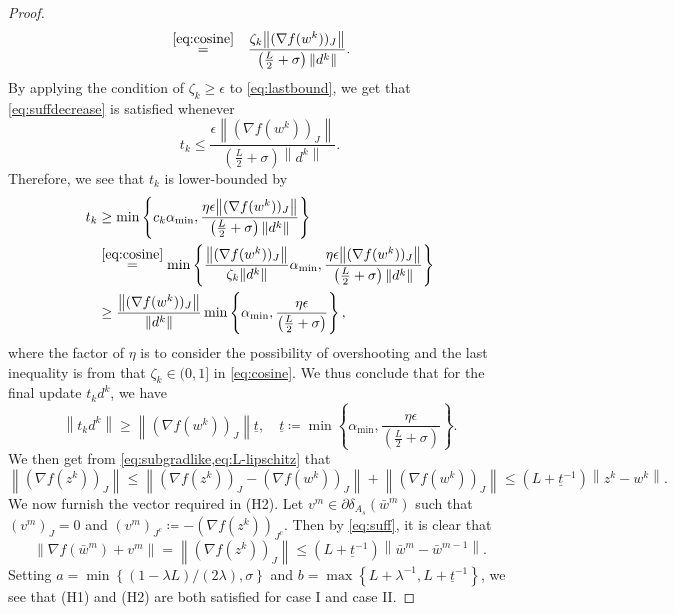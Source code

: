 \documentclass{article}
\theoremstyle{plain}
\theoremstyle{definition}
\theoremstyle{remark}
\newcommand{\norm}[1]{{\left\|{#1}\right\|}}
\begin{document}
\begin{proof}
\begin{eqnarray}
	&\stackrel{\cref{eq:cosine}}{=}& \frac{\zeta_k \norm{(\nabla  
			f(w^k))_{J}}}{\left( \frac{L}{2} + \sigma
		\right)\norm{d^k}}.
	\end{eqnarray}
	By applying the condition of $\zeta_k \geq \epsilon$ to
	\eqref{eq:lastbound},
	we get that \cref{eq:suffdecrease} is satisfied whenever
	\[
		t_k \leq
	\frac{\epsilon \norm{(\nabla  f(w^k))_{J}}}{\left( \frac{L}{2} +
	\sigma\right) \norm{d^k}}.
	\]
	Therefore, we see that $t_k$ is lower-bounded by
	\begin{align*}
		t_k &\geq \min\left\{c_k \alpha_{\min}, 
		\frac{\eta \epsilon \norm{(\nabla  f(w^k))_{J}}}{\left( \frac{L}{2} +
		\sigma\right) \norm{d^k}} \right\} \\
			&\stackrel{\cref{eq:cosine}}{=}
			\min\left\{\frac{\norm{(\nabla f(w^k))_{J} }}{\zeta_k
				\norm{d^k}} \alpha_{\min}, 
			\frac{\eta \epsilon \norm{(\nabla  f(w^k))_{J}}}{\left( \frac{L}{2} +
			\sigma\right) \norm{d^k}} \right\}\\
			&\geq \frac{\norm{(\nabla f(w^k))_{J} }}{\norm{d^k}}
			\min\left\{
				\alpha_{\min}, 
			\frac{\eta \epsilon }{\left( \frac{L}{2} +
			\sigma\right)} \right\},
	\end{align*}
	where the factor of $\eta$ is to consider the possibility of
	overshooting and the last inequality is from that $\zeta_k \in
	(0,1]$ in \cref{eq:cosine}.
	We thus conclude that for the final update $t_k d^k$, we have
	\begin{equation}
	\norm{t_k d^k} \geq \norm{(\nabla  f(w^k))_{J}}
	\underline{t}, \quad \underline{t} \coloneqq
			\min\left\{
				\alpha_{\min}, 
			\frac{\eta \epsilon }{\left( \frac{L}{2} +
			\sigma\right)} \right\}.
	\label{eq:subgradlike}
	\end{equation}
	We then get from \cref{eq:subgradlike,eq:L-lipschitz} that
	\begin{equation}
	\norm{(\nabla f(z^k))_{J} } \leq \norm{(\nabla f(z^k))_{J}  -
		(\nabla f(w^k))_{J} } + \norm{(\nabla f(w^k))_{J} }
	\leq (L + \underline{t}^{-1}) \norm{z^k -
		w^k}.
	\label{eq:suff}
	\end{equation}
	We now furnish the vector required in (H2). Let $v^m\in \partial 
	\delta_{A_s}(\bar{w}^m)$ such that $(v^m)_{J} = 0$ and $(v^m)_{J^c} 
	\coloneqq -(\nabla f(z^k))_{J^c}$. Then by \cref{eq:suff}, it is clear that
		\[\norm{ \nabla f(\bar{w}^m) + v^m} = \norm{(\nabla f(z^k))_{J} } \leq 
		(L + \underline{t}^{-1}) \norm{\bar{w}^m - \bar{w}^{m-1}}. \]
	Setting $a = \min\left\{(1-\lambda L)/(2\lambda) , \sigma \right\}$ and 
	$b = \max \left\{ L + \lambda^{-1}, L+\underline t ^{-1}
	\right\}$, we see that (H1) and (H2) are both satisfied for case I and case 
	II. 
	

\end{proof}
\end{document}
